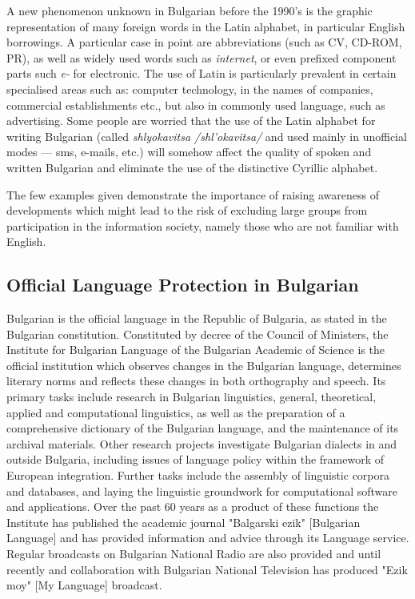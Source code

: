 \documentclass[]{../../metanetpaper}
\begin{document}
\begin{multicols}{2}
A new phenomenon unknown in Bulgarian before the 1990’s is the graphic representation of many foreign words in the Latin alphabet, in particular English borrowings. A particular case in point are abbreviations (such as CV, CD-ROM, PR), as well as widely used words such as \textit{internet}, or even prefixed component parts such \textit{e-} for electronic. The use of Latin is particularly prevalent in certain specialised areas such as: computer technology, in the names of companies, commercial establishments etc., but also in commonly used language, such as advertising. Some people are worried that the use of the Latin alphabet for writing Bulgarian (called \textit{{shlyokavitsa} /shl’okavitsa/} and used mainly in unofficial modes — sms, e-mails, etc.) \cite{shlyokavica} will somehow affect the quality of spoken and written Bulgarian and eliminate the use of the distinctive Cyrillic alphabet.

The few examples given demonstrate the importance of raising awareness of developments which might lead to the risk of excluding large groups from participation in the information society, namely those who are not familiar with English.

\subsection{Official Language Protection in Bulgarian}

Bulgarian is the official language in the Republic of Bulgaria, as stated in the Bulgarian constitution. Constituted by decree of the Council of Ministers, the Institute for Bulgarian Language of the Bulgarian Academic of Science is the official institution which observes changes in the Bulgarian language, determines literary norms and reflects these changes in both orthography and speech. Its primary tasks include research in Bulgarian linguistics, general, theoretical, applied and computational linguistics, as well as the preparation of a comprehensive dictionary of the Bulgarian language, and the maintenance of its archival materials. Other research projects investigate Bulgarian dialects in and outside Bulgaria, including issues of language policy within the framework of European integration. Further tasks include the assembly of linguistic corpora and databases, and laying the linguistic groundwork for computational software and applications. Over the past 60 years as a 
 product of these functions the Institute has published the academic journal "Balgarski ezik" [Bulgarian Language] and has provided information and advice through its Language service. Regular broadcasts on Bulgarian National Radio are also provided and until recently and collaboration with Bulgarian National Television has produced "Ezik moy" [My Language] broadcast. 


\end{multicols}
\end{document}
